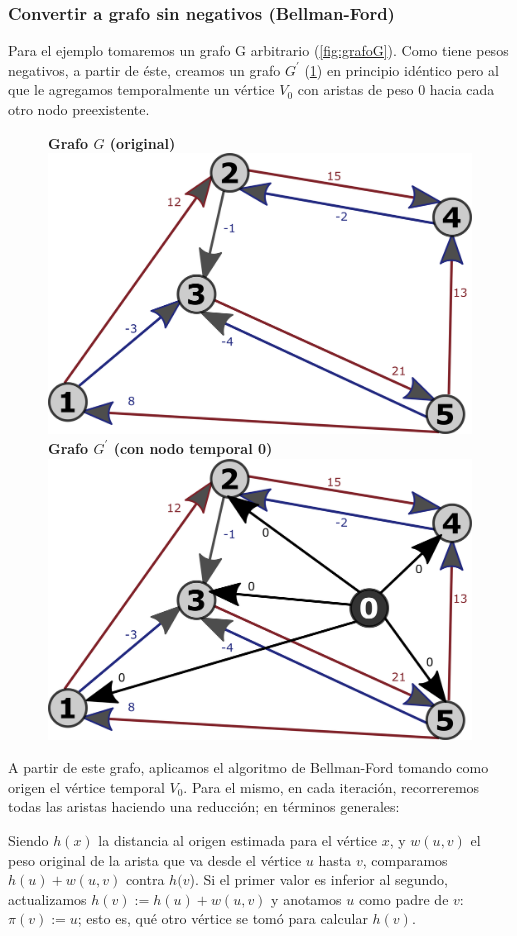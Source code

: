 \documentclass[../tp2_grupo404.tex]{subfiles}
\begin{document}
\subsubsection{Convertir a grafo sin negativos (Bellman-Ford)}\label{sec:parte1_4_1}
Para el ejemplo tomaremos un grafo G arbitrario (\cref{fig:grafoG}).
Como tiene pesos negativos, a partir de éste, creamos un grafo $G^\prime$ (\cref{fig:grafoG_prima})
en principio idéntico pero al que le agregamos temporalmente un
vértice $V_0$ con aristas de peso $0$ hacia cada otro nodo preexistente.

\begin{figure}[H]
    \centering
    \subcaptionbox
        {\label{fig:grafoG}\textbf{Grafo $G$ (original)}}
        {\includegraphics[width=0.4\linewidth,angle=0,origin=c]{out/ford/ford1A.png}}
    \subcaptionbox
        {\label{fig:grafoG_prima}\textbf{Grafo $G^\prime$ (con nodo temporal 0)}}
        {\includegraphics[width=0.4\linewidth,angle=0,origin=c]{out/ford/ford1B.png}}
\end{figure}

A partir de este grafo, aplicamos el algoritmo de Bellman-Ford tomando
como origen el vértice temporal $V_0$. Para el mismo, en cada iteración,
recorreremos todas las aristas haciendo una reducción;
en términos generales:
\begin{displayquote}
Siendo $h(x)$ la distancia al origen estimada para el vértice $x$,
y $w(u,v)$ el peso original de la arista que va desde el vértice $u$ hasta $v$,
comparamos $h(u)+w(u,v)$ contra $h(v$). Si el primer valor es inferior al
segundo, actualizamos $h(v) := h(u)+w(u,v)$ y anotamos $u$ como padre de $v$:
$\pi(v):=u$; esto es, qué otro vértice se tomó para calcular $h(v)$.
\end{displayquote}
\end{document}
